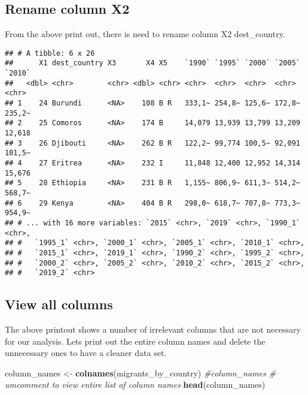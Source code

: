 \documentclass[]{article}
\newenvironment{Shaded}{\begin{snugshade}}{\end{snugshade}}
\newcommand{\KeywordTok}[1]{\textcolor[rgb]{0.13,0.29,0.53}{\textbf{#1}}}
\newcommand{\DataTypeTok}[1]{\textcolor[rgb]{0.13,0.29,0.53}{#1}}
\newcommand{\StringTok}[1]{\textcolor[rgb]{0.31,0.60,0.02}{#1}}
\newcommand{\CommentTok}[1]{\textcolor[rgb]{0.56,0.35,0.01}{\textit{#1}}}
\newcommand{\OperatorTok}[1]{\textcolor[rgb]{0.81,0.36,0.00}{\textbf{#1}}}
\newcommand{\NormalTok}[1]{#1}
\begin{document}
\subsection{Rename column X2}\label{rename-column-x2}

From the above print out, there is need to rename column X2
dest\_country.

\begin{Shaded}
\end{Shaded}

\begin{verbatim}
## # A tibble: 6 x 26
##      X1 dest_country X3       X4 X5    `1990` `1995` `2000` `2005` `2010`
##   <dbl> <chr>        <chr> <dbl> <chr> <chr>  <chr>  <chr>  <chr>  <chr> 
## 1    24 Burundi      <NA>    108 B R   333,1~ 254,8~ 125,6~ 172,8~ 235,2~
## 2    25 Comoros      <NA>    174 B     14,079 13,939 13,799 13,209 12,618
## 3    26 Djibouti     <NA>    262 B R   122,2~ 99,774 100,5~ 92,091 101,5~
## 4    27 Eritrea      <NA>    232 I     11,848 12,400 12,952 14,314 15,676
## 5    28 Ethiopia     <NA>    231 B R   1,155~ 806,9~ 611,3~ 514,2~ 568,7~
## 6    29 Kenya        <NA>    404 B R   298,0~ 618,7~ 707,8~ 773,3~ 954,9~
## # ... with 16 more variables: `2015` <chr>, `2019` <chr>, `1990_1` <chr>,
## #   `1995_1` <chr>, `2000_1` <chr>, `2005_1` <chr>, `2010_1` <chr>,
## #   `2015_1` <chr>, `2019_1` <chr>, `1990_2` <chr>, `1995_2` <chr>,
## #   `2000_2` <chr>, `2005_2` <chr>, `2010_2` <chr>, `2015_2` <chr>,
## #   `2019_2` <chr>
\end{verbatim}

\subsection{View all columns}\label{view-all-columns}

The above printout shows a number of irrelevant columns that are not
necessary for our analysis. Lets print out the entire column names and
delete the unnecessary ones to have a cleaner data set.

\begin{Shaded}
\begin{Highlighting}[]
\NormalTok{column_names <-}\StringTok{ }\KeywordTok{colnames}\NormalTok{(migrants_by_country)}
\CommentTok{#column_names # umcomment to view entire list of column names}
\KeywordTok{head}\NormalTok{(column_names)}
\end{Highlighting}
\end{Shaded}
\end{document}
